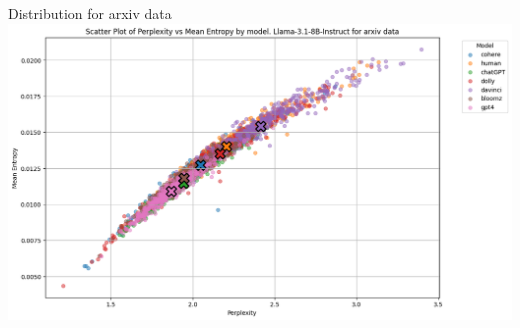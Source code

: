 \documentclass[12pt,pdf,hyperref={unicode}]{beamer}
\begin{document}
\begin{frame}{Distribution for arxiv data}
\includegraphics[width=1\textwidth]{arxiv.png}   
\end{frame}
\end{document}
